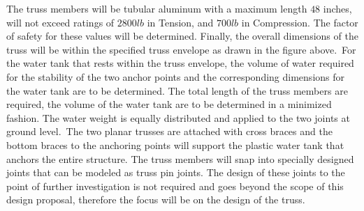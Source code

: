 The truss members will be tubular aluminum with a maximum length $48$ inches, will not exceed ratings of $2800 lb$ in Tension, and $700 lb$ in Compression. The factor of safety for these values will be determined. Finally, the overall dimensions of the truss will be within the specified truss envelope as drawn in the figure above.\
For the water tank that rests within the truss envelope, the volume of water required for the stability of the two anchor points and the corresponding dimensions for the water tank are to be determined. The total length of the truss members are required, the volume of the water tank are to be determined in a minimized fashion. The water weight is equally distributed and applied to the two joints at ground level.\
The two planar trusses are attached with cross braces and the bottom braces to the anchoring points will support the plastic water tank that anchors the entire structure. The truss members will snap into specially designed joints that can be modeled as truss pin joints. The design of these joints to the point of further investigation is not required and goes beyond the scope of this design proposal, therefore the focus will be on the design of the truss.\
